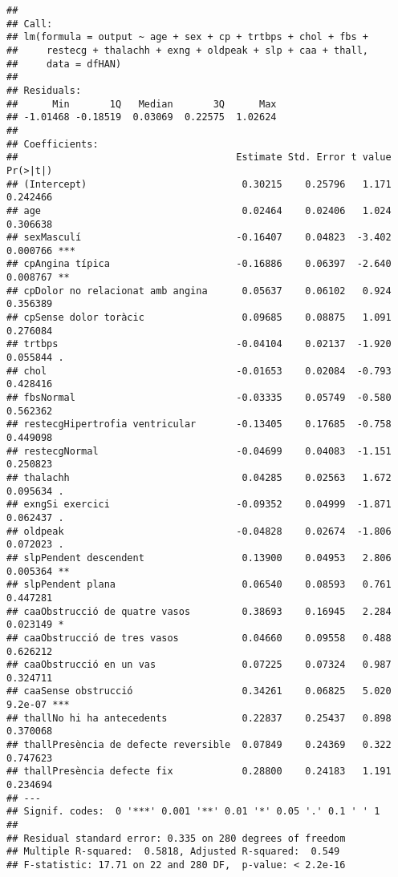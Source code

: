 \documentclass[
]{article}
\begin{document}
\begin{verbatim}
## 
## Call:
## lm(formula = output ~ age + sex + cp + trtbps + chol + fbs + 
##     restecg + thalachh + exng + oldpeak + slp + caa + thall, 
##     data = dfHAN)
## 
## Residuals:
##      Min       1Q   Median       3Q      Max 
## -1.01468 -0.18519  0.03069  0.22575  1.02624 
## 
## Coefficients:
##                                      Estimate Std. Error t value Pr(>|t|)    
## (Intercept)                           0.30215    0.25796   1.171 0.242466    
## age                                   0.02464    0.02406   1.024 0.306638    
## sexMasculí                           -0.16407    0.04823  -3.402 0.000766 ***
## cpAngina típica                      -0.16886    0.06397  -2.640 0.008767 ** 
## cpDolor no relacionat amb angina      0.05637    0.06102   0.924 0.356389    
## cpSense dolor toràcic                 0.09685    0.08875   1.091 0.276084    
## trtbps                               -0.04104    0.02137  -1.920 0.055844 .  
## chol                                 -0.01653    0.02084  -0.793 0.428416    
## fbsNormal                            -0.03335    0.05749  -0.580 0.562362    
## restecgHipertrofia ventricular       -0.13405    0.17685  -0.758 0.449098    
## restecgNormal                        -0.04699    0.04083  -1.151 0.250823    
## thalachh                              0.04285    0.02563   1.672 0.095634 .  
## exngSi exercici                      -0.09352    0.04999  -1.871 0.062437 .  
## oldpeak                              -0.04828    0.02674  -1.806 0.072023 .  
## slpPendent descendent                 0.13900    0.04953   2.806 0.005364 ** 
## slpPendent plana                      0.06540    0.08593   0.761 0.447281    
## caaObstrucció de quatre vasos         0.38693    0.16945   2.284 0.023149 *  
## caaObstrucció de tres vasos           0.04660    0.09558   0.488 0.626212    
## caaObstrucció en un vas               0.07225    0.07324   0.987 0.324711    
## caaSense obstrucció                   0.34261    0.06825   5.020  9.2e-07 ***
## thallNo hi ha antecedents             0.22837    0.25437   0.898 0.370068    
## thallPresència de defecte reversible  0.07849    0.24369   0.322 0.747623    
## thallPresència defecte fix            0.28800    0.24183   1.191 0.234694    
## ---
## Signif. codes:  0 '***' 0.001 '**' 0.01 '*' 0.05 '.' 0.1 ' ' 1
## 
## Residual standard error: 0.335 on 280 degrees of freedom
## Multiple R-squared:  0.5818, Adjusted R-squared:  0.549 
## F-statistic: 17.71 on 22 and 280 DF,  p-value: < 2.2e-16
\end{verbatim}
\end{document}

